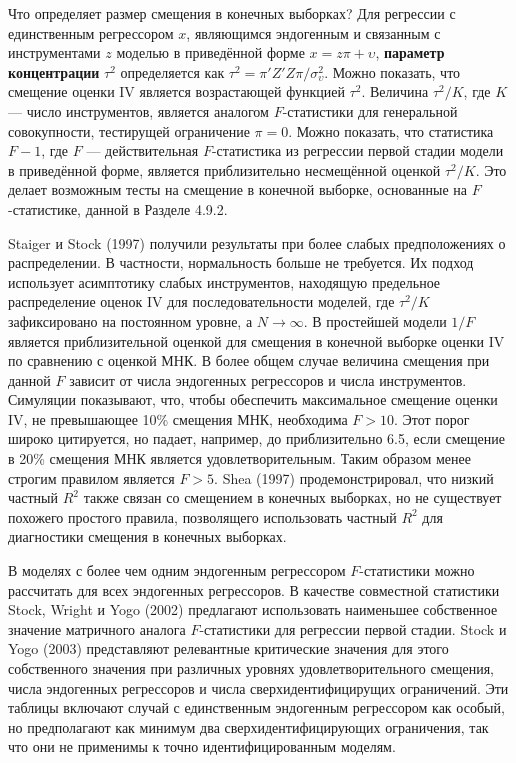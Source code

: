 Что определяет размер смещения в конечных выборках? Для регрессии с единственным регрессором $x$, являющимся эндогенным и связанным с инструментами $z$ моделью в приведённой форме $x = z\pi +\upsilon$, \textbf{параметр концентрации} $\tau^2$ определяется как $\tau^2 = \pi'Z'Z\pi/\sigma^2_\upsilon$. Можно показать, что смещение оценки IV является возрастающей функцией $\tau^2$. Величина $\tau^2/K$, где $K$ --- число инструментов, является аналогом $F$-статистики для генеральной совокупности, тестирущей ограничение $\pi=0$. Можно показать, что статистика $F-1$, где $F$ --- действительная $F$-статистика из регрессии первой стадии модели в приведённой форме, является приблизительно несмещённой оценкой $\tau^2/K$. Это делает возможным тесты на смещение в конечной выборке, основанные на $F$-статистике, данной в Разделе 4.9.2.

Staiger и Stock (1997) получили результаты при более слабых предположениях о распределении. В частности, нормальность больше не требуется. Их подход использует асимптотику слабых инструментов, находящую предельное распределение оценок IV  для последовательности моделей, где $\tau^2/K$ зафиксировано на постоянном уровне, а $N\longrightarrow \infty$. В простейшей модели $1/F$ является приблизительной оценкой для смещения в конечной выборке оценки IV по сравнению с оценкой МНК. В более общем случае величина смещения при данной $F$ зависит от числа эндогенных регрессоров и числа инструментов. Симуляции показывают, что, чтобы обеспечить максимальное смещение оценки IV, не превышающее 10\% смещения МНК, необходима $F>10$. Этот порог широко цитируется, но падает, например, до приблизительно 6.5, если смещение в 20\% смещения МНК является удовлетворительным. Таким образом менее строгим правилом является $F>5$. Shea (1997) продемонстрировал, что низкий частный $R^2$ также связан со смещением в конечных выборках, но не существует похожего простого правила, позволящего использовать частный $R^2$ для диагностики смещения в конечных выборках.

В моделях с более чем одним эндогенным регрессором $F$-статистики можно рассчитать для всех эндогенных регрессоров. В качестве совместной статистики Stock, Wright и Yogo (2002) предлагают использовать наименьшее собственное значение матричного аналога $F$-статистики для регрессии первой стадии. Stock и Yogo (2003) представляют релевантные критические значения для этого собственного значения при различных уровнях удовлетворительного смещения, числа эндогенных регрессоров и числа сверхидентифицирущих ограничений. Эти таблицы включают случай с единственным эндогенным регрессором как особый, но предполагают как минимум два сверхидентифицирующих ограничения, так что они не применимы к точно идентифицированным моделям. 

